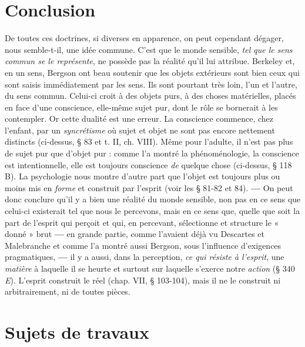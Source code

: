 \section{Conclusion}%
De toutes ces doctrines, si diverses en apparence,
on peut cependant dégager, nous semble-t-il, une idée commune.
C'est que le monde sensible, {\it tel que le sens commun se le représente},
ne possède pas la réalité qu’il lui attribue. Berkeley et, en un sens,
Bergson ont beau soutenir que les objets extérieurs sont bien ceux
qui sont saisis immédiatement par les sens. Ils sont pourtant très
loin, l’un et l’autre, du sens commun. Celui-ci croit à des objets purs,
à des choses matérielles, placés en face d’une conscience, elle-même
sujet pur, dont le rôle se bornerait à les contempler. Or cette dualité
est une erreur. La conscience commence, chez l’enfant, par un {\it syncrétisme}
où sujet et objet ne sont pas encore nettement distincts
(ci-dessus, § 83 et t. II, ch. VIII). Même pour l’adulte, il n’est pas plus
de sujet pur que d’objet pur : comme l’a montré la phénoménologie,
la conscience est intentionnelle, elle est toujours conscience {\it de} quelque
chose (ci-dessus, § 118 B). La psychologie nous montre d’autre part
que l’objet est toujours plus ou moins mis en {\it forme} et construit par
l'esprit (voir les § 81-82 et 84). {\bf —} On peut donc conclure qu’il y a bien
une réalité du monde sensible, non pas en ce sens que celui-ci existerait
tel que nous le percevons, mais en ce sens que, quelle que soit la part
de l'esprit qui perçoit et qui, en percevant, sélectionne et structure le
« donné » brut {\bf —} en grande partie, comme l’avaient déjà vu Descartes
et Malebranche et comme l’a montré aussi Bergson, sous l'influence
d’exigences pragmatiques, {\bf —} il y a aussi, dans la perception, {\it ce qui
résiste à l'esprit}, une {\it matière} à laquelle il se heurte et surtout sur laquelle
s’exerce notre {\it action} (§ 340 {\it E}). L'esprit construit le réel (chap. VII,
§ 103-104), mais il ne le construit ni arbitrairement, ni de toutes
pièces.

\section{Sujets de travaux}%


